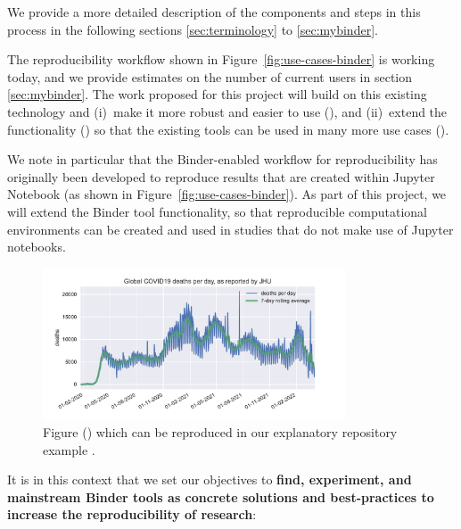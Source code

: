 We provide a more detailed description of the components and steps in this
process in the following sections \ref{sec:terminology} to \ref{sec:mybinder}.

The reproducibility workflow shown in Figure~\ref{fig:use-cases-binder} is
working today, and we provide estimates on the number of current users in
section \ref{sec:mybinder}. The work proposed for this project will build on
this existing technology and (i)~make it more robust and easier to use
(), and (ii)~extend the functionality () so
that the existing tools can be used in many more use cases
().

We note in particular that the Binder-enabled workflow for reproducibility has
originally been developed to reproduce results that are created within Jupyter
Notebook (as shown in Figure~\ref{fig:use-cases-binder}). As part of this
project, we will extend the Binder tool functionality, so that reproducible
computational environments can be created and used in studies that do not make
use of Jupyter notebooks.

\begin{figure}
  \centering
  \includegraphics[width=0.8\textwidth]{images/figure1.pdf}
  \caption{Figure () which can be reproduced in our explanatory repository example
    \cite{ReproducibilityRepositoryExample2022}. \label{fig:reproducibility-example-covid}}
\end{figure}



It is in this context that we set our objectives to \textbf{find, experiment, and mainstream Binder tools as concrete solutions and best-practices to increase the reproducibility of research}:

